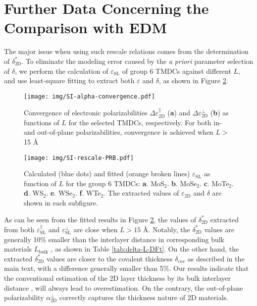\documentclass[manuscript=suppinfo,email=true,hyperref=true,keywords=false]{achemso}
\begin{document}
\pagebreak{}
\section{Further Data Concerning the Comparison with EDM}
\label{sec:2D-3D-rescale}

The major issue when using such rescale
relations comes from the determination of $\delta_{\mathrm{2D}}^{*}$. To
eliminate the modeling error caused by the \textit{a priori} parameter
selection of $\delta$, we perform the calculation of
$\varepsilon_{\mathrm{SL}}$ of group 6 TMDCs against different $L$,
and use least-square fitting to extract both
$\varepsilon$ and $\delta$, as shown in
Figure \ref{fig:rescale-prb}.

\begin{figure}[htbp]
  \centering
  \texttt{[image: img/SI-alpha-convergence.pdf]}
  \caption{Convergence of electronic polarizabilities
    $\Delta \varepsilon_{\mathrm{2D}}^{\parallel}$ (\textbf{a}) and
    $\Delta \varepsilon_{\mathrm{2D}}^{\perp}$ (\textbf{b}) as
    functions of $L$ for the selected TMDCs, respectively. For both
    in- and out-of-plane polarizabilities, convergence is achieved
    when $L >$15 \AA{}}
  \label{fig:alpha-converg}
\end{figure}

\begin{figure}[htbp]
  \centering
  \texttt{[image: img/SI-rescale-PRB.pdf]}
  \caption{ Calculated (blue dots) and fitted
    (orange broken lines) $\varepsilon_{\mathrm{SL}}$ as function of
    $L$ for the group 6 TMDCs:
    \textbf{a}. MoS$_{2}$. \textbf{b}. MoSe$_{2}$. \textbf{c}.
    MoTe$_{2}$. \textbf{d}. WS$_{2}$. \textbf{e}. WSe$_{2}$. \textbf{f}.
    WTe$_{2}$. The extracted values of $\varepsilon_{\mathrm{2D}}$ and
    $\delta$ are shown in each subfigure.}
  \label{fig:rescale-prb}
\end{figure}

As can be seen from the fitted results in Figure
\ref{fig:rescale-prb}, the values of $\delta_{\mathrm{2D}}^{*}$ extracted
from both $\varepsilon_{\mathrm{SL}}^{\parallel}$ and
$\varepsilon_{\mathrm{SL}}^{\perp}$ are close when $L> 15$
{\AA}. Notably, the $\delta_{\mathrm{2D}}^{*}$ values are generally 10\%
smaller than the interlayer distance in corresponding bulk materials
$L_{\mathrm{bulk}}$ , as shown in Table \ref{tab:delta-L-DFt}. On the
other hand, the extracted $\delta_{\mathrm{2D}}^{*}$ values are closer to
the covalent thickness $\delta_{cov}$ as
described in the main text, with a difference generally smaller than
5\%. Our results indicate that the conventional estimation of the 2D
layer thickness by its bulk interlayer distance
\cite{Matthes_2016,Laturia_2018}, will always lead to
overestimation. On the contrary, the out-of-plane polarizability
$\alpha_{\mathrm{2D}}^{\perp}$ correctly captures the thickness nature
of 2D materials.
\end{document}
